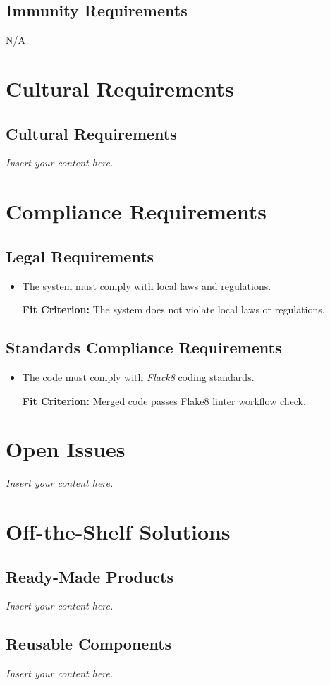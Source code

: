 \documentclass[12pt]{article}
\newcommand{\lips}{\textit{Insert your content here.}}
\newcounter{nfrnum} %
\newcommand{\rthenfrnum}{NFR\refstepcounter{nfrnum}\thenfrnum:}
\begin{document}
\subsection{Immunity Requirements}
N/A

\section{Cultural Requirements}
\subsection{Cultural Requirements}
\lips

\section{Compliance Requirements}
\subsection{Legal Requirements}
\begin{itemize}
\item[\rthenfrnum]
The system must comply with local laws and regulations.

\textbf{Fit Criterion:} The system does not violate local laws or regulations.
\end{itemize}
\subsection{Standards Compliance Requirements}
\begin{itemize}
\item[\rthenfrnum]
The code must comply with \textit{Flack8} coding standards.

\textbf{Fit Criterion:} Merged code passes Flake8 linter workflow check.
\end{itemize}
\section{Open Issues}
\lips

\section{Off-the-Shelf Solutions}
\subsection{Ready-Made Products}
\lips
\subsection{Reusable Components}
\lips
\end{document}

